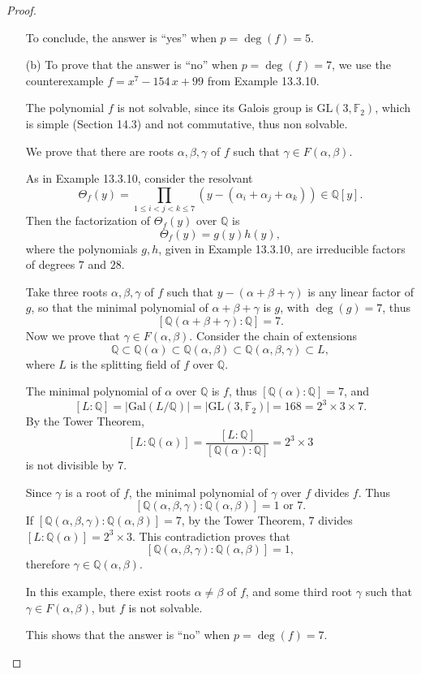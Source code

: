 \documentclass[11pt,a4paper]{article}
\newcommand{\Q}{\mathbb{Q}}
\newcommand{\F}{\mathbb{F}}
\newcommand{\Gal}{\mathrm{Gal}}
\begin{document}
\begin{proof}
\begin{enumerate}
To conclude, the answer is ``yes''  when $p = \deg(f) = 5$.
\item[(b)] To prove that the answer is ``no''  when $p = \deg(f) = 7$, we use the counterexample $f = x^7-154\, x+99$ from Example 13.3.10.

The polynomial $f$ is not solvable, since its Galois group is $\mathrm{GL}(3,\F_2)$, which is simple (Section 14.3) and not commutative, thus non solvable.

We prove that there are roots $\alpha,\beta, \gamma$ of $f$ such that $\gamma \in F(\alpha,\beta)$.

As in Example 13.3.10, consider the resolvant
$$\Theta_f(y) = \prod_{1\leq i < j < k \leq 7} \left(y - (\alpha_i + \alpha_j + \alpha_k)\right) \in \Q[y].$$
Then the factorization of $\Theta_f(y)$ over $\Q$ is 
$$\Theta_f(y) = g(y) h(y),$$
where the polynomials $g,h$, given in Example 13.3.10, are irreducible factors of degrees $7$ and $28$.

Take three roots $\alpha,\beta,\gamma$ of $f$ such that $y-(\alpha+\beta+ \gamma)$ is any linear factor of $g$, so that the minimal polynomial of $\alpha+\beta+ \gamma$ is $g$, with $\deg(g) = 7$, thus
$$[\Q(\alpha+\beta+\gamma) : \Q] = 7.$$
Now we prove that $\gamma \in F(\alpha,\beta)$. Consider the chain of extensions
$$\Q\subset \Q(\alpha) \subset \Q(\alpha,\beta) \subset \Q(\alpha,\beta,\gamma) \subset L,$$
where $L$ is the splitting field of $f$ over $\Q$.

The minimal polynomial of $\alpha$ over $\Q$ is $f$, thus $[\Q(\alpha) : \Q] = 7$, and 
$$[L:\Q] = |\Gal(L/\Q)| = |\mathrm{GL}(3,\F_2)| = 168 = 2^3 \times 3 \times 7.$$
By the Tower Theorem,
$$[L : \Q(\alpha)] = \frac{ [L : \Q]}{[ \Q(\alpha) : \Q]} = 2^3 \times 3$$
is not divisible by 7.

Since $\gamma$ is a root of $f$, the minimal polynomial of $\gamma$ over $f$ divides $f$. Thus
$$[\Q(\alpha,\beta,\gamma) : \Q(\alpha,\beta)] = 1\text{ or } 7.$$
If $[\Q(\alpha,\beta,\gamma) : \Q(\alpha,\beta)]  = 7$, by the Tower Theorem, $7$ divides $[L : \Q(\alpha)] = 2^3\times 3$. This contradiction proves that 
$$[\Q(\alpha,\beta,\gamma) : \Q(\alpha,\beta)] = 1,$$
therefore $\gamma \in \Q(\alpha,\beta).$

In this example, there exist roots $\alpha \ne \beta$ of $f$, and some third root $\gamma$ such that $\gamma \in F(\alpha,\beta)$, but $f$ is not solvable.

This shows that the answer is ``no'' when $p =\deg(f) = 7$.
\end{enumerate}

\end{proof}
\qquad
\end{document}
